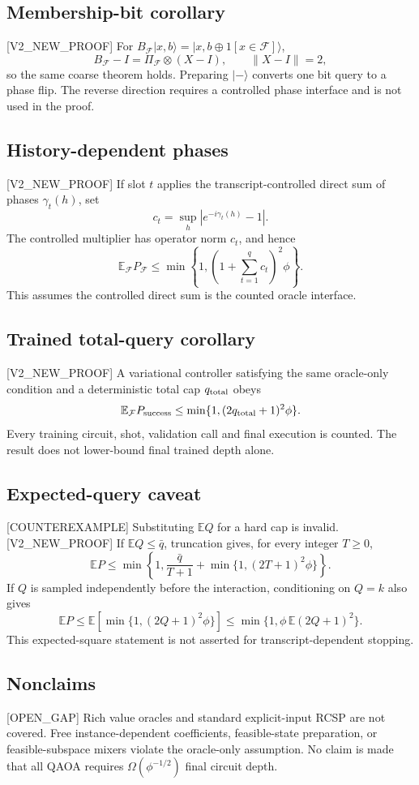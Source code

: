 \documentclass{article}
\newcommand{\F}{\mathcal F}
\newcommand{\tagclaim}[1]{\textsf{[#1]}}
\begin{document}
\subsection*{Membership-bit corollary}
\tagclaim{V2\_NEW\_PROOF} For
$B_\F|x,b\rangle=|x,b\oplus1[x\in\F]\rangle$,
\[
 B_\F-I=\Pi_\F\otimes(X-I),\qquad\|X-I\|=2,
\]
so the same coarse theorem holds. Preparing $|-\rangle$ converts one bit query to a
phase flip. The reverse direction requires a controlled phase interface and is
not used in the proof.

\subsection*{History-dependent phases}
\tagclaim{V2\_NEW\_PROOF} If slot $t$ applies the transcript-controlled direct
sum of phases $\gamma_t(h)$, set
\[
 c_t=\sup_h|e^{-i\gamma_t(h)}-1|.
\]
The controlled multiplier has operator norm $c_t$, and hence
\[
 \mathbb E_\F P_\F\le
 \min\left\{1,\left(1+\sum_{t=1}^q c_t\right)^2\phi\right\}.
\]
This assumes the controlled direct sum is the counted oracle interface.

\subsection*{Trained total-query corollary}
\tagclaim{V2\_NEW\_PROOF} A variational controller satisfying the same
oracle-only condition and a deterministic total cap $q_{\rm total}$ obeys
\[
 \mathbb E_\F P_{\rm success}
 \le\min\{1,(2q_{\rm total}+1)^2\phi\}.
\]
Every training circuit, shot, validation call and final execution is counted.
The result does not lower-bound final trained depth alone.

\subsection*{Expected-query caveat}
\tagclaim{COUNTEREXAMPLE} Substituting $\mathbb E Q$ for a hard cap is invalid.
\tagclaim{V2\_NEW\_PROOF} If $\mathbb E Q\le\bar q$, truncation gives, for every
integer $T\ge0$,
\[
 \mathbb E P\le\min\left\{1,\frac{\bar q}{T+1}
 +\min\{1,(2T+1)^2\phi\}\right\}.
\]
If $Q$ is sampled independently before the interaction, conditioning on
$Q=k$ also gives
\[
 \mathbb E P\le
 \mathbb E\!\left[\min\{1,(2Q+1)^2\phi\}\right]
 \le\min\{1,\phi\,\mathbb E(2Q+1)^2\}.
\]
This expected-square statement is not asserted for transcript-dependent
stopping.

\subsection*{Nonclaims}
\tagclaim{OPEN\_GAP} Rich value oracles and standard explicit-input RCSP are
not covered. Free instance-dependent coefficients, feasible-state preparation,
or feasible-subspace mixers violate the oracle-only assumption. No claim is
made that all QAOA requires $\Omega(\phi^{-1/2})$ final circuit depth.
\end{document}
